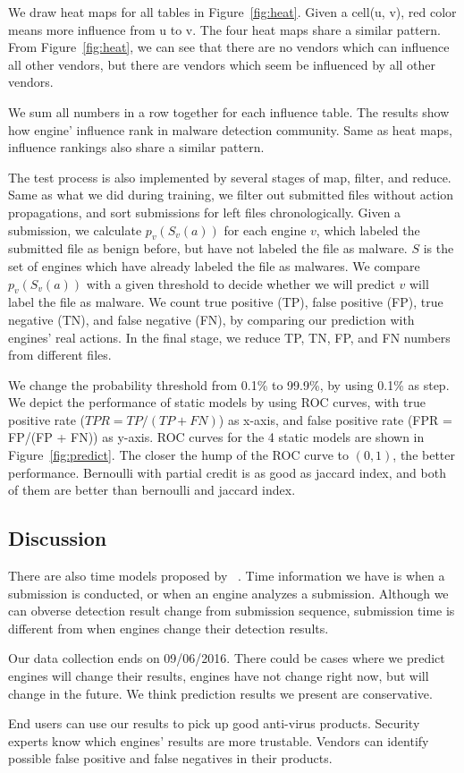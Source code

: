 

We draw heat maps for all tables in Figure~\ref{fig:heat}. 
Given a cell(u, v), red color means more influence from u to v. 
The four heat maps share a similar pattern.
From Figure~\ref{fig:heat}, 
we can see that there are no vendors which can influence all other vendors, 
but there are vendors which seem be influenced by all other vendors.  

We sum all numbers in a row together for each influence table. 
The results show how engine' influence rank in malware detection community. 
Same as heat maps, influence rankings also share a similar pattern. 

The test process is also implemented by several stages of map, filter, and reduce. 
Same as what we did during training, 
we filter out submitted files without action propagations, 
and sort submissions for left files chronologically. 
Given a submission, we calculate $p_v(S_v(a))$ for each engine $v$, 
which labeled the submitted file as benign before, but have not labeled the file as malware. 
$S$ is the set of engines which have already labeled the file as malwares.
We compare $p_v(S_v(a))$ with a given threshold to decide whether we will predict 
$v$ will label the file as malware. We count true positive (TP), false positive (FP), true negative (TN), 
and false negative (FN), by comparing our prediction with engines' real actions. 
In the final stage, we reduce TP, TN, FP, and FN numbers from different files.




We change the probability threshold from 0.1\% to 99.9\%, by using 0.1\% as step. 
We depict the performance of static models by using ROC curves, 
with true positive rate ($TPR = TP/(TP+FN)$) as x-axis, 
and false positive rate (FPR = FP/(FP + FN)) as y-axis. 
ROC curves for the 4 static models are shown in Figure~\ref{fig:predict}. 
The closer the hump of the ROC curve to $(0,1)$, the better performance.
Bernoulli with partial credit is as good as jaccard index, 
and both of them are better than bernoulli and jaccard index. 


\subsection{Discussion}

There are also time models proposed by ~\citet{Influence}. 
Time information we have is when a submission is conducted, or when an engine analyzes a submission. 
Although we can obverse detection result change from submission sequence, 
submission time is different from when engines change their detection results. 

Our data collection ends on 09/06/2016. 
There could be cases where we predict engines will change their results, 
engines have not change right now, but will change in the future.  
We think prediction results we present are conservative. 

End users can use our results to pick up good anti-virus products. 
Security experts know which engines’ results are more trustable. 
Vendors can identify possible false positive and false negatives in their products. 